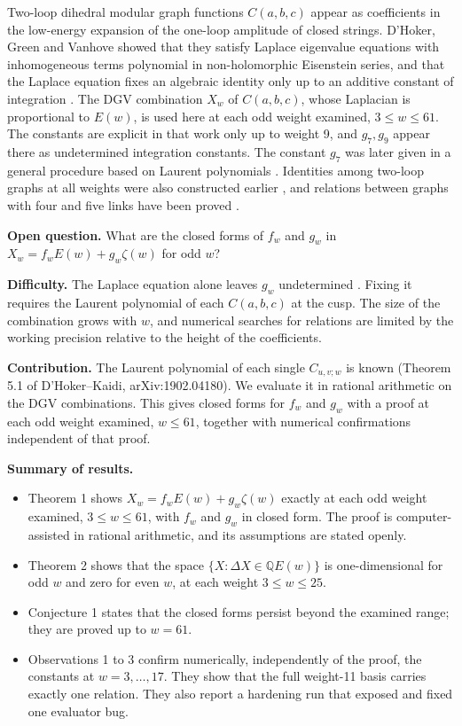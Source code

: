 \documentclass[10pt,twocolumn]{article}
\providecommand{\tightlist}{\setlength{\itemsep}{0pt}\setlength{\parskip}{0pt}}
\theoremstyle{definition}\newtheorem{definition}{Definition}\newtheorem{example}{Example}
\begin{document}
Two-loop dihedral modular graph functions \(C(a,b,c)\) appear as coefficients in the low-energy expansion of the one-loop amplitude of closed strings. D'Hoker, Green and Vanhove showed that they satisfy Laplace eigenvalue equations with inhomogeneous terms polynomial in non-holomorphic Eisenstein series, and that the Laplace equation fixes an algebraic identity only up to an additive constant of integration \cite{DHoker20156698}. The DGV combination \(X_w\) of \(C(a,b,c)\), whose Laplacian is proportional to \(E(w)\), is used here at each odd weight examined, \(3\le w\le 61\). The constants are explicit in that work only up to weight 9, and \(g_7,g_9\) appear there as undetermined integration constants. The constant \(g_7\) was later given in a general procedure based on Laurent polynomials \cite{Dorigoni20215017}. Identities among two-loop graphs at all weights were also constructed earlier \cite{DHoker201693v3}, and relations between graphs with four and five links have been proved \cite{Basu20165011}.

\textbf{Open question.} What are the closed forms of \(f_w\) and \(g_w\) in \(X_w=f_wE(w)+g_w\zeta(w)\) for odd \(w\)?

\textbf{Difficulty.} The Laplace equation alone leaves \(g_w\) undetermined \cite{DHoker20156698}. Fixing it requires the Laurent polynomial of each \(C(a,b,c)\) at the cusp. The size of the combination grows with \(w\), and numerical searches for relations are limited by the working precision relative to the height of the coefficients.

\textbf{Contribution.} The Laurent polynomial of each single \(C_{u,v;w}\) is known (Theorem 5.1 of D'Hoker--Kaidi, arXiv:1902.04180). We evaluate it in rational arithmetic on the DGV combinations. This gives closed forms for \(f_w\) and \(g_w\) with a proof at each odd weight examined, \(w\le 61\), together with numerical confirmations independent of that proof.

\textbf{Summary of results.}

\begin{itemize}
\tightlist
\item
  Theorem 1 shows \(X_w=f_wE(w)+g_w\zeta(w)\) exactly at each odd weight examined, \(3\le w\le 61\), with \(f_w\) and \(g_w\) in closed form. The proof is computer-assisted in rational arithmetic, and its assumptions are stated openly.
\item
  Theorem 2 shows that the space \(\{X:\Delta X\in\mathbb{Q}E(w)\}\) is one-dimensional for odd \(w\) and zero for even \(w\), at each weight \(3\le w\le 25\).
\item
  Conjecture 1 states that the closed forms persist beyond the examined range; they are proved up to \(w=61\).
\item
  Observations 1 to 3 confirm numerically, independently of the proof, the constants at \(w=3,\dots,17\). They show that the full weight-11 basis carries exactly one relation. They also report a hardening run that exposed and fixed one evaluator bug.
\end{itemize}
\end{document}
